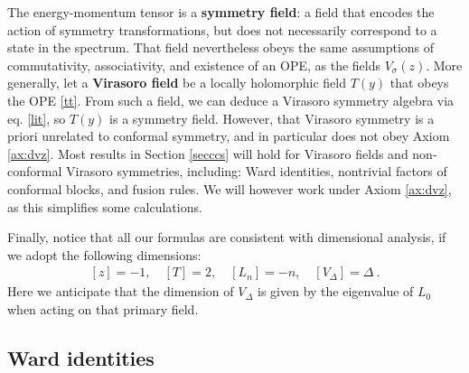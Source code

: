 \documentclass[12pt, a4paper, notitlepage, twoside]{report}
\numberwithin{equation}{section}
\theoremstyle{break}
\begin{document}
The energy-momentum tensor is a \textbf{\boldmath symmetry field}: a field that encodes the action of symmetry transformations, but does not necessarily correspond to a state in the spectrum. 
That field nevertheless obeys the same assumptions of commutativity, associativity, and existence of an OPE, as the fields $V_\sigma(z)$.
More generally, let a \textbf{Virasoro field} be a locally holomorphic field $T(y)$ that obeys the OPE \eqref{tt}. 
From such a field, we can deduce a Virasoro symmetry algebra via eq. \eqref{lit}, so $T(y)$ is a symmetry field. However, that Virasoro symmetry is a priori unrelated to conformal symmetry, and in particular does not obey Axiom \ref{ax:dvz}. 
Most results in Section \ref{secccs} will hold for Virasoro fields and non-conformal Virasoro symmetries, including: Ward identities, nontrivial factors of conformal blocks, and fusion rules. We will however work under Axiom \ref{ax:dvz}, as this simplifies some calculations.

Finally, notice that all our formulas are consistent with dimensional analysis, if we adopt the following dimensions:
\begin{align}
 \boxed{[z]=-1,\quad [T]=2, \quad [L_n]=-n, \quad [V_\Delta]=\Delta}\ .
\label{zaz}
\end{align}
Here we anticipate that the dimension of $V_\Delta$ is given by the eigenvalue of $L_0$ when acting on that primary field.


\subsection{Ward identities \label{secswi}}
\end{document}

